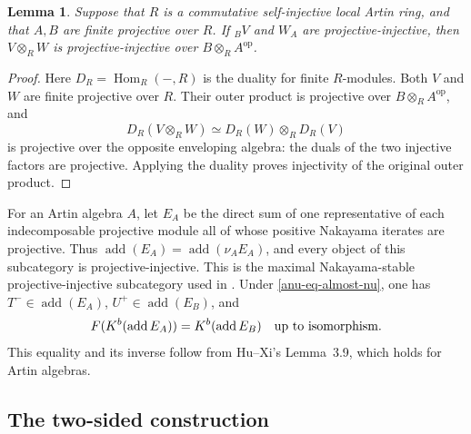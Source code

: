 \documentclass[12pt,a4paper,english,reqno]{amsart}
\numberwithin{equation}{section}
\theoremstyle{plain}
\newtheorem{lemma}[theorem]{Lemma}
\theoremstyle{definition}
\begin{document}
\begin{lemma}\label{anu-lem-outer-injective}
Suppose that $R$ is a commutative self-injective local Artin ring,
and that $A,B$ are finite projective over $R$.  If ${}_BV$ and
$W_A$ are projective-injective, then $V\otimes_RW$ is
projective-injective over $B\otimes_RA^{\mathrm{op}}$.
\end{lemma}

\begin{proof}
Here $D_R=\operatorname{Hom}_R(-,R)$ is the duality for finite
$R$-modules.  Both $V$ and $W$ are finite projective over $R$.
Their outer product is projective over
$B\otimes_RA^{\mathrm{op}}$, and
\[
 D_R(V\otimes_RW)\simeq D_R(W)\otimes_RD_R(V)
\]
is projective over the opposite enveloping algebra: the duals of
the two injective factors are projective.  Applying the duality
proves injectivity of the original outer product.
\end{proof}

For an Artin algebra $A$, let $E_A$ be the direct sum of one
representative of each indecomposable projective module all of whose
positive Nakayama iterates are projective.  Thus
$\operatorname{add}(E_A)=\operatorname{add}(\nu_AE_A)$, and every
object of this subcategory is projective-injective.  This is the
maximal Nakayama-stable projective-injective subcategory used in
\cite[Proposition~3.8 and Lemma~3.9, pp.~129--130]{HuXi2010}.
Under \eqref{anu-eq-almost-nu}, one has $T^-\in\operatorname{add}(E_A)$,
$U^+\in\operatorname{add}(E_B)$, and
\begin{equation}\label{anu-eq-E-restriction}
 F(K^b(\operatorname{add}E_A))=K^b(\operatorname{add}E_B)
 \quad\hbox{up to isomorphism.}
\end{equation}
This equality and its inverse follow from Hu--Xi's Lemma~3.9,
which holds for Artin algebras.

\subsection{The two-sided construction}
\end{document}
